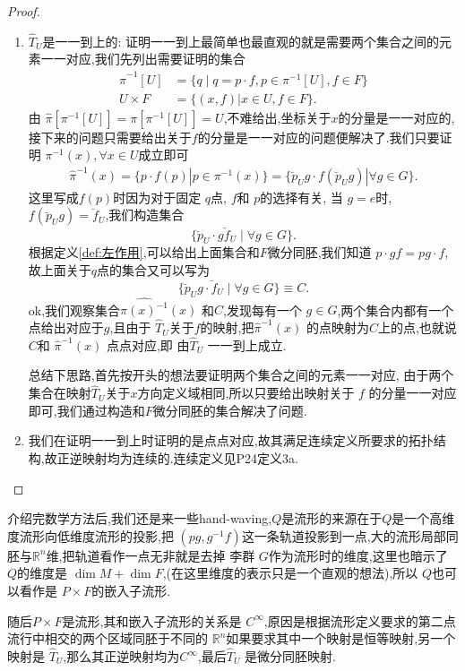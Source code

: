 \documentclass[../main.tex]{subfiles}
\begin{document}
 \begin{proof}
  \begin{enumerate}
    \item $\hat{T}_U$是一一到上的: 证明一一到上最简单也最直观的就是需要两个集合之间的元素一一对应,我们先列出需要证明的集合
      \begin{align*}
        \hat{\pi}^{-1}[U] &= \{q  \mid q = p \cdot f , p \in \pi^{-1}[U], f \in F\} \\
        U \times F & = \{(x,f)| x \in U, f \in F\}
      .\end{align*}
      由 $\hat{\pi}[\pi^{-1}[U]] = \pi[\pi^{-1}[U]]=U$,不难给出,坐标关于$x$的分量是一一对应的,接下来的问题只需要给出关于$f$的分量是一一对应的问题便解决了.我们只要证明 $\pi^{-1}(x), \forall x \in U$成立即可
      \begin{align*}
    \hat{\pi}^{-1}(x) = \{ p \cdot f(p) | p \in \pi^{-1}(x)\} = \{ \breve{p}_Ug \cdot f(\breve{p}_U g) | \forall g \in G\}
      .\end{align*}
      这里写成$f(p)$时因为对于固定 $q$点, $f$和 $p$的选择有关, 当 $g = e$时, $f(\breve{p}_Ug) = \breve{f}_U$,我们构造集合 \[
        \{\breve{p}_U \cdot g\breve{f}_U \mid \forall g \in G\} 
      .\] 根据定义\ref{def:左作用},可以给出上面集合和$F$微分同胚,我们知道 $p \cdot gf = p g\cdot f$,故上面关于$q$点的集合又可以写为\[
        \{\breve{p}_U g\cdot \breve{f}_U \mid \forall g \in G\} \equiv C
      .\] 
      ok,我们观察集合$\hat{\pi(x)^{-1}}(x)$ 和$C$,发现每有一个 $g \in G$,两个集合内都有一个点给出对应于$g$,且由于 $\hat{T}_U$关于$f$的映射,把$\hat{\pi}^{-1}(x)$ 的点映射为$C$上的点,也就说 $C$和 $\hat{\pi}^{-1}(x)$ 点点对应,即
      由$\hat{T}_U$ 一一到上成立.
      \begin{note}
       总结下思路,首先按开头的想法要证明两个集合之间的元素一一对应, 由于两个集合在映射$\hat{T}_U$关于$x$方向定义域相同,所以只要给出映射关于 $f$ 的分量一一对应即可,我们通过构造和$F$微分同胚的集合解决了问题.
      \end{note}
    \item 我们在证明一一到上时证明的是点点对应,故其满足连续定义所要求的拓扑结构,故正逆映射均为连续的.连续定义见P24定义3a.
  \end{enumerate} 
 \end{proof}
 \begin{note}
   介绍完数学方法后,我们还是来一些hand-waving,$Q$是流形的来源在于$Q$是一个高维度流形向低维度流形的投影,把 $(pg,g^{-1}f)$这一条轨道投影到一点,大的流形局部同胚与$\mathbb{R}^n$维,把轨道看作一点无非就是去掉
   李群 $G$作为流形时的维度,这里也暗示了 $Q$的维度是 $\dim{M}+ \dim{F}$,(在这里维度的表示只是一个直观的想法),所以 $Q$也可以看作是 $P\times F$的嵌入子流形.
 \end{note}
 随后$P\times F$是流形,其和嵌入子流形的关系是 $C^\infty$,原因是根据流形定义要求的第二点流行中相交的两个区域同胚于不同的 $\mathbb{R}^n$如果要求其中一个映射是恒等映射,另一个映射是 $\hat{T}_U$,那么其正逆映射均为$C^\infty$,最后$\hat{T}_U$ 是微分同胚映射.
\end{document}
